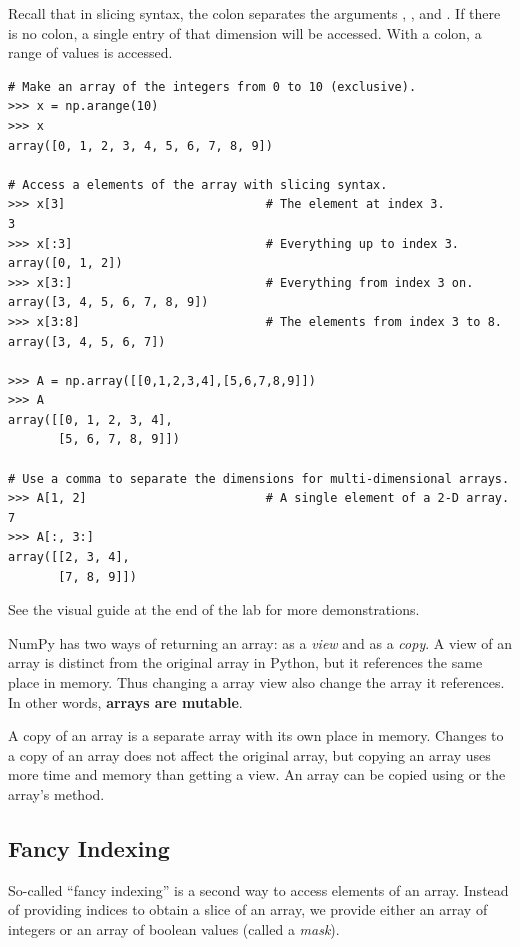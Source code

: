 Recall that in slicing syntax, the colon \li{:} separates the arguments , , and .
If there is no colon, a single entry of that dimension will be accessed.
With a colon, a range of values is accessed.

\begin{lstlisting}
# Make an array of the integers from 0 to 10 (exclusive).
>>> x = np.arange(10)
>>> x
array([0, 1, 2, 3, 4, 5, 6, 7, 8, 9])

# Access a elements of the array with slicing syntax.
>>> x[3]                            # The element at index 3.
3
>>> x[:3]                           # Everything up to index 3.
array([0, 1, 2])
>>> x[3:]                           # Everything from index 3 on.
array([3, 4, 5, 6, 7, 8, 9])
>>> x[3:8]                          # The elements from index 3 to 8.
array([3, 4, 5, 6, 7])

>>> A = np.array([[0,1,2,3,4],[5,6,7,8,9]])
>>> A
array([[0, 1, 2, 3, 4],
       [5, 6, 7, 8, 9]])

# Use a comma to separate the dimensions for multi-dimensional arrays.
>>> A[1, 2]                         # A single element of a 2-D array.
7
>>> A[:, 3:]
array([[2, 3, 4],
       [7, 8, 9]])
\end{lstlisting}

See the visual guide at the end of the lab for more demonstrations.

\begin{info} %
NumPy has two ways of returning an array: as a \emph{view} and as a \emph{copy}.
A view of an array is distinct from the original array in Python, but it references the same place in memory. 
Thus changing a array view also change the array it references.
In other words, \textbf{arrays are mutable}.

A copy of an array is a separate array with its own place in memory. 
Changes to a copy of an array does not affect the original array, but copying an array uses more time and memory than getting a view.
An array can be copied using  or the array's  method.
\end{info}

\subsection*{Fancy Indexing} %

So-called ``fancy indexing'' is a second way to access elements of an array.
Instead of providing indices to obtain a slice of an array, we provide either an array of integers or an array of boolean values (called a \emph{mask}).

